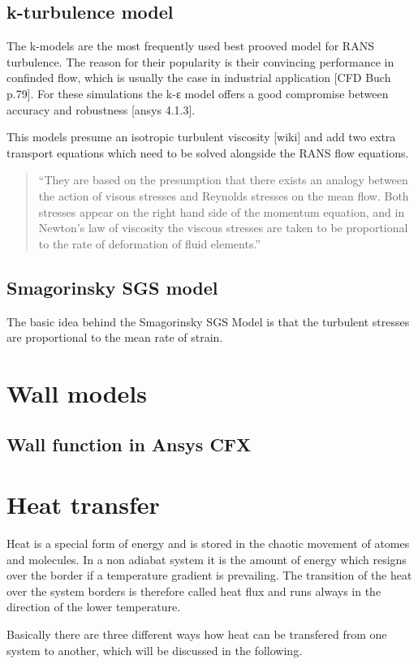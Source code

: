 \subsection{k-\textepsilon  turbulence model}
The k-\textepsilon  models are the most frequently used best prooved model for RANS turbulence. The reason for their popularity is their convincing performance in confinded flow, which is usually the case in industrial application [CFD Buch p.79]. For these simulations the k-ε model offers a good compromise between accuracy and robustness [ansys 4.1.3].

This models presume an isotropic turbulent viscosity [wiki] and add two extra transport equations which need to be solved alongside the RANS flow equations.
\begin{quote}
``They are based on the presumption that there exists an analogy between the action of visous stresses and Reynolds stresses on the mean flow. Both stresses appear on the right hand side of the momentum equation, and in Newton’s law of viscosity the viscous stresses are taken to be proportional to the rate of deformation of fluid elements.''
\end{quote}
\subsection{Smagorinsky SGS model}
The basic idea behind the Smagorinsky SGS Model is that the turbulent stresses are proportional to the mean rate of strain.
\section{Wall models}
\subsection{Wall function in Ansys CFX}
\section{Heat transfer}
Heat is a special form of energy and is stored in the chaotic movement of atomes and molecules. In a non adiabat system it is the amount of energy which resigns over the border if a temperature gradient is prevailing. The transition of the heat over the system borders is therefore called heat flux and runs always in the direction of the lower temperature.

Basically there are three different ways how heat can be transfered from one system to another, which will be discussed in the following.
